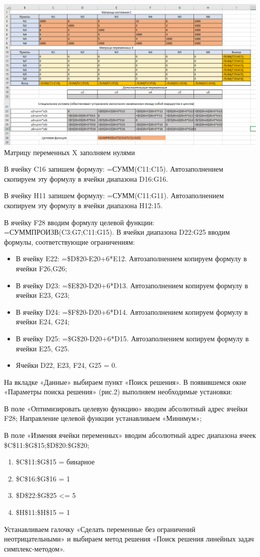 \documentclass[a4paper, 12pt]{article}
\begin{document}
\includegraphics[width=\textwidth]{3-1.png}\\

Матрицу переменных X заполняем нулями 

В ячейку C16 запишем формулу: =СУММ(C11:C15). Автозаполнением скопируем эту формулу в ячейки диапазона D16:G16. 

В ячейку H11 запишем формулу: =СУММ(C11:G11). Автозаполнением скопируем эту формулу в ячейки диапазона H12:15. 

В ячейку F28 вводим формулу целевой функции: =СУММПРОИЗВ(C3:G7;C11:G15). В ячейки диапазона D22:G25 вводим формулы, соответствующие ограничениям: 
\begin{itemize}
	\item В ячейку E22: =\$D\$20-E20+6*E12. Автозаполнением копируем формулу в ячейки F26,G26; 
	\item В ячейку D23: =\$E\$20-D20+6*D13. Автозаполнением копируем формулу в ячейки E23, G23; 
	\item В ячейку D24: =\$F\$20-D20+6*D14. Автозаполнением копируем формулу в ячейки E24, G24; 
	\item В ячейку D25: =\$G\$20-D20+6*D15. Автозаполнением копируем формулу в ячейки E25, G25. 
	\item Ячейки D22, E23, F24, G25 = 0.
\end{itemize}

На вкладке «Данные» выбираем пункт «Поиск решения». В появившемся окне «Параметры поиска решения» (рис.2) выполняем необходимые установки: 

В поле «Оптимизировать целевую функцию» вводим абсолютный адрес ячейки F28; Направление целевой функции устанавливаем «Минимум»; 

В поле «Изменяя ячейки переменных» вводим абсолютный адрес диапазона ячеек \\\$C\$11:\$G\$15;\$D\$20:\$G\$20;
\begin{enumerate}
\item\$C\$11:\$G\$15 = бинарное 
\item\$C\$16:\$G\$16 = 1 
\item\$D\$22:\$G\$25 <= 5 
\item\$H\$11:\$H\$15 = 1 
\end{enumerate}
Устанавливаем галочку «Сделать переменные без ограничений неотрицательными» и выбираем метод решения «Поиск решения линейных задач симплекс-методом».\\
\end{document}
